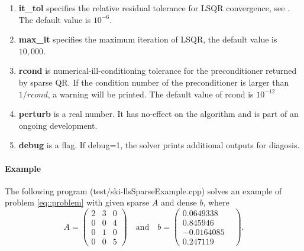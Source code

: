 \documentclass[english,11pt]{article}
\begin{document}
\begin{itemize}
\begin{enumerate}
			\item {\bf it_tol} specifies the relative residual tolerance for LSQR convergence, see \cite{Paige:1982aa}. The default value is $10^{-6}$.

			\item {\bf max_it} specifies the maximum iteration of LSQR, the default value is $10,000$. 

			\item {\bf rcond} is numerical-ill-conditioning tolerance for the preconditioner returned by sparse QR. If the condition number of the preconditioner is larger than $1/rcond$, a warning will be printed. The default value of rcond is $10^{-12}$

			\item {\bf perturb} is a real number. It has no-effect on the algorithm and is part of an ongoing development. 

			\item {\bf debug} is a flag. If debug=1, the solver prints additional outputs for diagosis. 
		\end{enumerate}
		

	\end{itemize}

\paragraph{Example}

The following program (test/ski-llsSparseExample.cpp) solves an example of problem \eqref{eq::problem} with given sparse $A$ and dense $b$, where 
\begin{equation}
A = \begin{pmatrix}
     2     & 3     & 0\\
     0     & 0     & 4\\
     0     & 1     & 0\\
     0     & 0     & 5
\end{pmatrix} \quad \text{and} \quad 
b = \begin{pmatrix}
0.0649338 \\
0.845946 \\
-0.0164085\\
0.247119 & 
\end{pmatrix}.
\end{equation}
\end{document}
